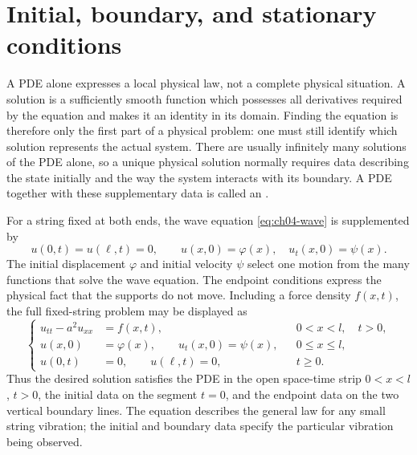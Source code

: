 \section{Initial, boundary, and stationary conditions}

A PDE alone expresses a local physical law, not a complete physical situation. A solution is a sufficiently smooth function which possesses all derivatives required by the equation and makes it an identity in its domain. Finding the equation is therefore only the first part of a physical problem: one must still identify which solution represents the actual system. There are usually infinitely many solutions of the PDE alone, so a unique physical solution normally requires data describing the state initially and the way the system interacts with its boundary. A PDE together with these supplementary data is called an .

For a string fixed at both ends, the wave equation \eqref{eq:ch04-wave} is supplemented by
\begin{equation}
u(0,t)=u(\ell,t)=0,
\qquad
u(x,0)=\varphi(x),\quad u_t(x,0)=\psi(x).
\label{eq:ch04-string-ibvp}
\end{equation}
The initial displacement $\varphi$ and initial velocity $\psi$ select one motion from the many functions that solve the wave equation. The endpoint conditions express the physical fact that the supports do not move. Including a force density $f(x,t)$, the full fixed-string problem may be displayed as
\begin{equation}
\left\{
\begin{aligned}
u_{tt}-a^2u_{xx}&=f(x,t), &&0<x<l,\quad t>0,\\
u(x,0)&=\varphi(x),\qquad u_t(x,0)=\psi(x), &&0\leq x\leq l,\\
u(0,t)&=0,\qquad u(\ell,t)=0, &&t\geq0.
\end{aligned}
\right.
\label{eq:ch04-full-string-ibvp}
\end{equation}
Thus the desired solution satisfies the PDE in the open space-time strip $0<x<l$, $t>0$, the initial data on the segment $t=0$, and the endpoint data on the two vertical boundary lines. The equation describes the general law for any small string vibration; the initial and boundary data specify the particular vibration being observed.

